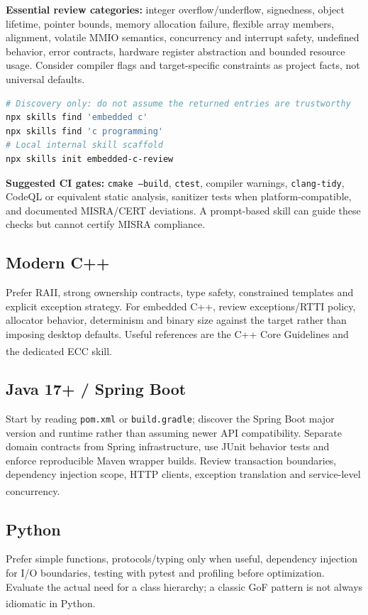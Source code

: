 \documentclass[11pt,letterpaper]{article}
\newcommand{\src}[1]{\textsuperscript{\textcolor{teal}{\cite{#1}}}}
\begin{document}
\textbf{Essential review categories:} integer overflow/underflow, signedness, object lifetime, pointer bounds, memory allocation failure, flexible array members, alignment, volatile MMIO semantics, concurrency and interrupt safety, undefined behavior, error contracts, hardware register abstraction and bounded resource usage. Consider compiler flags and target-specific constraints as project facts, not universal defaults.
\begin{lstlisting}[language=bash]
# Discovery only: do not assume the returned entries are trustworthy
npx skills find 'embedded c'
npx skills find 'c programming'
# Local internal skill scaffold
npx skills init embedded-c-review
\end{lstlisting}
\textbf{Suggested CI gates:} \texttt{cmake --build}, \texttt{ctest}, compiler warnings, \texttt{clang-tidy}, CodeQL or equivalent static analysis, sanitizer tests when platform-compatible, and documented MISRA/CERT deviations. A prompt-based skill can guide these checks but cannot certify MISRA compliance.

\subsection{Modern C++}
Prefer RAII, strong ownership contracts, type safety, constrained templates and explicit exception strategy. For embedded C++, review exceptions/RTTI policy, allocator behavior, determinism and binary size against the target rather than imposing desktop defaults. Useful references are the C++ Core Guidelines and the dedicated ECC skill.\src{cppcore,cppskill}

\subsection{Java 17+ / Spring Boot}
Start by reading \texttt{pom.xml} or \texttt{build.gradle}; discover the Spring Boot major version and runtime rather than assuming newer API compatibility. Separate domain contracts from Spring infrastructure, use JUnit behavior tests and enforce reproducible Maven wrapper builds. Review transaction boundaries, dependency injection scope, HTTP clients, exception translation and service-level concurrency.\src{javaspring,javajunit}

\subsection{Python}
Prefer simple functions, protocols/typing only when useful, dependency injection for I/O boundaries, testing with pytest and profiling before optimization. Evaluate the actual need for a class hierarchy; a classic GoF pattern is not always idiomatic in Python.\src{wshobsonfile,pythonpatterns}
\end{document}

